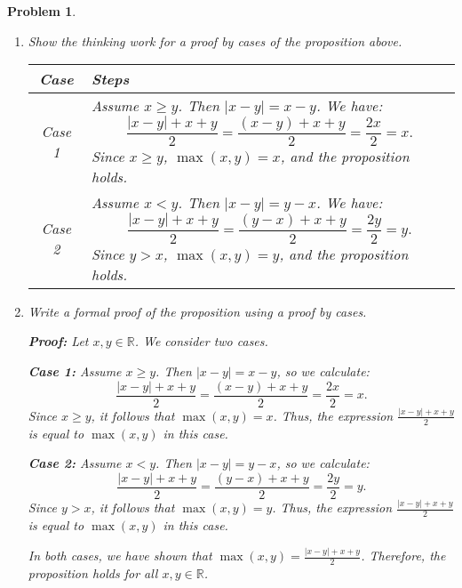\documentclass[12pt]{article}
\newtheorem{problem}{Problem}
\theoremstyle{definition}
\begin{document}
\begin{problem}
\begin{enumerate}[label=(\alph*)]
\item Show the thinking work for a proof by cases of the proposition above.

\begin{center}
    \begin{tabular}{|c|p{10cm}|}
    \hline
    \textbf{Case} & \textbf{Steps} \\
    \hline
    Case 1 & Assume \( x \geq y \). Then \( |x - y| = x - y \). We have:
    \[
    \frac{|x - y| + x + y}{2} = \frac{(x - y) + x + y}{2} = \frac{2x}{2} = x.
    \]
    Since \( x \geq y \), \( \max(x, y) = x \), and the proposition holds. \\
    \hline
    Case 2 & Assume \( x < y \). Then \( |x - y| = y - x \). We have:
    \[
    \frac{|x - y| + x + y}{2} = \frac{(y - x) + x + y}{2} = \frac{2y}{2} = y.
    \]
    Since \( y > x \), \( \max(x, y) = y \), and the proposition holds. \\
    \hline
    \end{tabular}
\end{center}

\item Write a formal proof of the proposition using a proof by cases.

\textbf{Proof:} Let \( x, y \in \mathbb{R} \). We consider two cases.

\textbf{Case 1:} Assume \( x \geq y \). Then \( |x - y| = x - y \), so we calculate:
\[
\frac{|x - y| + x + y}{2} = \frac{(x - y) + x + y}{2} = \frac{2x}{2} = x.
\]
Since \( x \geq y \), it follows that \( \max(x, y) = x \). Thus, the expression \( \frac{|x - y| + x + y}{2} \) is equal to \( \max(x, y) \) in this case.

\textbf{Case 2:} Assume \( x < y \). Then \( |x - y| = y - x \), so we calculate:
\[
\frac{|x - y| + x + y}{2} = \frac{(y - x) + x + y}{2} = \frac{2y}{2} = y.
\]
Since \( y > x \), it follows that \( \max(x, y) = y \). Thus, the expression \( \frac{|x - y| + x + y}{2} \) is equal to \( \max(x, y) \) in this case.

In both cases, we have shown that \( \max(x, y) = \frac{|x - y| + x + y}{2} \). Therefore, the proposition holds for all \( x, y \in \mathbb{R} \).

\end{enumerate}
\end{problem}
\end{document}
